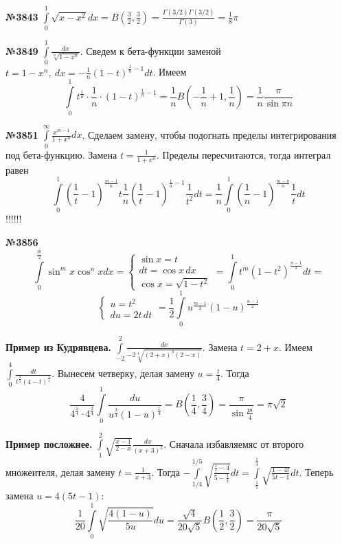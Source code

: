 \textbf{№3843} $\int\limits_{0}^{1} \sqrt{x-x^2}dx=B(\frac{3}{2},\frac{3}{2})=
\frac{\Gamma(3/2)\Gamma(3/2)}{\Gamma(3)}=\frac{1}{8}\pi$ 

\textbf{№3849} $\int\limits_{0}^{1} \frac{dx}{\sqrt[n]{1-x^n}}$. 
Сведем к бета-функции заменой 
$t=1-x^n,~dx=-\frac{1}{n}(1-t)^{\frac{1}{n}-1}dt$. Имеем 
$$\int\limits_{0}^{1}t^{\frac{1}{n}}\cdot \frac{1}{n}\cdot 
(1-t)^{\frac{1}{n}-1}=\frac{1}{n}B\left( -\frac{1}{n}+1,\frac{1}{n} \right)
=\frac{1}{n} \frac{\pi}{\sin\pi n}$$

\textbf{№3851} $\int\limits_{0}^{\infty}\frac{x^{m-1}}{1+x^n}dx$.
Сделаем замену, чтобы подогнать пределы интегрирования под бета-функцию. 
Замена $t=\frac{1}{1+x^n}$. Пределы пересчитаются, тогда интеграл равен
$$\int\limits_{0}^{1}(\frac{1}{t}-1)^{\frac{m-1}{n}}t \frac{1}{n}
(\frac{1}{t}-1)^{\frac{1}{n}-1}\frac{1}{t^2}dt=
\frac{1}{n}\int\limits_{0}^{1}\left( \frac{1}{n}-1 \right)^{\frac{m-n}{n}}
\frac{1}{t}dt$$ !!!!!!

\textbf{№3856} 
$$\int\limits_{0}^{\frac{pi}{2}}\sin^mx\cos^nxdx=
\begin{cases}\sin x=t\\dt=\cos x\,dx\\ \cos x=\sqrt{1-t^2}   
\end{cases}=
\int\limits_{0}^{1}t^m(1-t^2)^{\frac{n-1}{2}}dt=$$
$$\begin{cases} u=t^2\\du=2t \,dt
\end{cases}
=\frac{1}{2}\int\limits_{0}^{1}u^{\frac{m-1}{2}}(1-u)^{\frac{n-1}{2}} 
$$

\textbf{Пример из Кудрявцева.} $\int\limits_{-2}^{2}\frac{dx}{-2
\sqrt[4]{(2+x)^3(2-x)}}$. Замена $t=2+x$. Имеем
$\int\limits_{0}^{4} \frac{dt}{t^{\frac{3}{4}}(4-t)^{\frac{1}{4}}}$.
Вынесем четверку, делая замену $u=\frac{t}{4}$. Тогда
$$\frac{4}{4^{\frac{1}{4}}\cdot 4^{\frac{3}{4}}}
\int\limits_{0}^{1}\frac{du}{u^{\frac{3}{4}}(1-u)^{\frac{1}{4}}}=
B\left( \frac{1}{4},\frac{3}{4} \right)=\frac{\pi}{\sin \frac{pi}{4}}=
\pi\sqrt{2}$$ 


\textbf{Пример посложнее.} $\int\limits_{1}^{2}\sqrt{\frac{x-1}{2-x}}
\frac{dx}{(x+3)^2}$. Сначала избавляемяс от второго множеителя, делая замену
$t=\frac{1}{x+3}$. Тогда $-\int\limits_{1/4}^{1/5}\sqrt{\frac{\frac{1}{t}-4}
{5-\frac{1}{t}}}dt=\int\limits_{\frac{1}{5}}^{\frac{1}{4}}
\sqrt{\frac{1-4t}{5t-1}}dt$. Теперь замена $u=4(5t-1)$:
$$\frac{1}{20}\int\limits_{0}^{1} \sqrt{\frac{4(1-u)}{5u}}du=
\frac{\sqrt{4}}{20\sqrt{5}}B\left( \frac{1}{2},\frac{3}{2} \right) =
\frac{\pi}{20\sqrt{5}}$$

